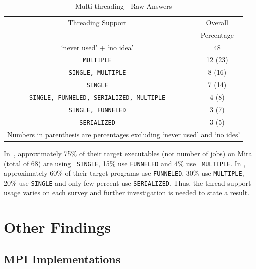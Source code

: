 \documentclass[conference,10pt,letterpaper]{IEEEtran}
\def\myquote#1{`#1'}
\begin{document}
\begin{table}[htb]%
  \begin{center}%
    \caption{Multi-threading - Raw Answers}\label{tab:multi-thread-raw}%
    \begin{tabular}{c|c}%
      \hline%
      Threading Support & Overall \\
      & Percentage \\
      \hline%
      \myquote{never used} + \myquote{no idea} & 48 \\
              {\tt MULTIPLE} & 12 (23) \\
              {\tt SINGLE, MULTIPLE} & 8 (16) \\
              {\tt SINGLE} & 7 (14) \\
              {\tt SINGLE, FUNNELED, SERIALIZED, MULTIPLE} & 4 (8) \\
              {\tt SINGLE, FUNNELED} & 3 (7) \\
              {\tt SERIALIZED} & 3 (5) \\
              \hline%
              \multicolumn{2}{c}{\footnotesize Numbers in parenthesis are
                percentages excluding \myquote{never used} and \myquote{no
                  ides}} 
    \end{tabular}%
  \end{center}%
\end{table}%

In~\cite{10.1109/SC.2018.00033}, approximately 75\% of their target
executables (not number of jobs) on Mira (total of 68) are using {\tt
  SINGLE}, 15\% use {\tt FUNNELED} and 4\% use {\tt
  MULTIPLE}. In \cite{10.1145/3295500.3356176}, approximately 60\% of
their target programs use {\tt FUNNELED}, 30\% use {\tt MULTIPLE}, 20\%
use {\tt SINGLE} and only few percent use {\tt SERIALIZED}. Thus, the
thread support usage varies on each survey and further investigation
is needed to state a result.

\section{Other Findings}

\subsection{MPI Implementations}
\end{document}
